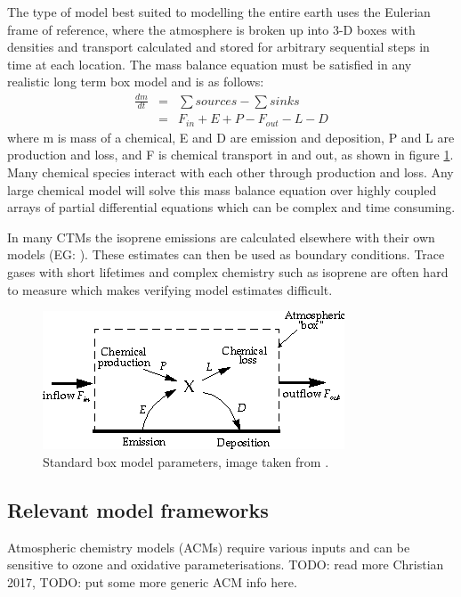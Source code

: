     The type of model best suited to modelling the entire earth uses the Eulerian frame of reference, where the atmosphere is broken up into 3-D boxes with densities and transport calculated and stored for arbitrary sequential steps in time at each location.
    The mass balance equation must be satisfied in any realistic long term box model and is as follows: 
    \begin{align*}
      \frac{dm}{dt} &=& \sum{sources}-\sum{sinks} \\
      &=& F_{in} + E + P - F_{out} - L - D 
    \end{align*}
    where m is mass of a chemical, E and D are emission and deposition, P and L are production and loss, and F is chemical transport in and out, as shown in figure \ref{ch_LitRev:fig:boxmodel}.
    Many chemical species interact with each other through production and loss. 
    Any large chemical model will solve this mass balance equation over highly coupled arrays of partial differential equations which can be complex and time consuming.
    
    In many CTMs the isoprene emissions are calculated elsewhere with their own models (EG: \citet{Guenther2006}).
    These estimates can then be used as boundary conditions.
    Trace gases with short lifetimes and complex chemistry such as isoprene are often hard to measure which makes verifying model estimates difficult.
    
    \begin{figure}
      \includegraphics{Figures/boxmodel.png}
      \caption{ Standard box model parameters, image taken from \citet{Jacob_1999_book}. }
      \label{ch_LitRev:fig:boxmodel}
    \end{figure}
    
  \subsection{Relevant model frameworks}
  \label{LR:Models:frames}
    
    Atmospheric chemistry models (ACMs) require various inputs and can be sensitive to ozone and oxidative parameterisations. 
    TODO: read more Christian 2017,
    TODO: put some more generic ACM info here.
    
